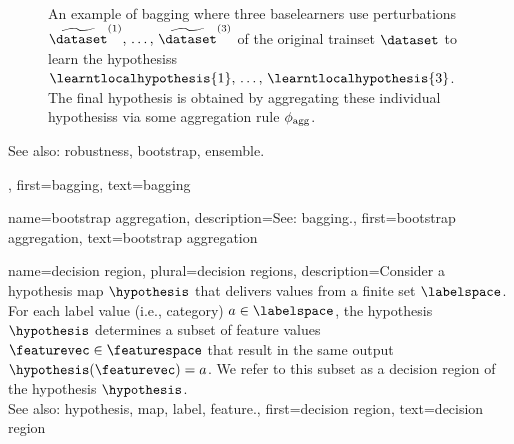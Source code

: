 {{\begin{figure}[htbp]
\begin{center}
		\caption{An example of bagging where three \glspl{baselearner} use perturbations  
		$\widetilde{\dataset}^{(1)},\,\ldots,\,\widetilde{\dataset}^{(3)}$ of 
		the original \gls{trainset} $\dataset$ to learn the \glspl{hypothesis} 
		$\learntlocalhypothesis{1},\,\ldots,\,\learntlocalhypothesis{3}$. The final 
		\gls{hypothesis} is obtained by aggregating these individual \glspl{hypothesis} 
		via some aggregation rule $\phi_{\rm agg}$.}
		\end{center}
		\end{figure}
		See also: \gls{robustness}, \gls{bootstrap}, \gls{ensemble}.},
	first={bagging},
	text={bagging}
}

{name={bootstrap aggregation}, 
 description={See: \gls{bagging}.},
 first={bootstrap aggregation},
 text={bootstrap aggregation} 
}

{name={decision region}, plural={decision regions}, 
	description={Consider 
		a \gls{hypothesis} \gls{map} $\hypothesis$ that delivers values from a finite set $\labelspace$. 
		For each \gls{label} value (i.e., category) $a \in \labelspace$, the \gls{hypothesis} $\hypothesis$ 
		determines a subset of \gls{feature} values $\featurevec \in \featurespace$ that result 
		in the same output $\hypothesis(\featurevec)=a$. We refer to this subset as a decision 
		region of the \gls{hypothesis} $\hypothesis$. \\
		See also: \gls{hypothesis}, \gls{map}, \gls{label}, \gls{feature}.},
	first={decision region},
	text={decision region} 
}

